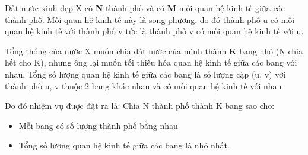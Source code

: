 Đất nước xinh đẹp X có \textbf{N} thành phố và có \textbf{M} mối quan hệ kinh tế giữa các thành phố. Mối quan hệ kinh tế này là song phương, do đó thành phố u có mối quan hệ kinh tế với thành phố v tức là thành phố v có mối quan hệ kinh tế với u.

Tổng thống của nước X muốn chia đất nước của mình thành \textbf{K} bang nhỏ (N chia hết cho K), nhưng ông lại muốn tối thiểu hóa quan hệ kinh tế giữa các bang với nhau. Tổng số lượng quan hệ kinh tế giữa các bang là số lượng cặp (u, v) với thành phố u, v thuộc 2 bang khác nhau và có mối quan hệ kinh tế với nhau

Do đó nhiệm vụ được đặt ra là: Chia N thành phố thành K bang sao cho:
\begin{itemize}
	\item Mỗi bang có số lượng thành phố bằng nhau
	\item Tổng số lượng quan hệ kinh tế giữa các bang là nhỏ nhất.
\end{itemize}
\begin{itemize}
\end{itemize}